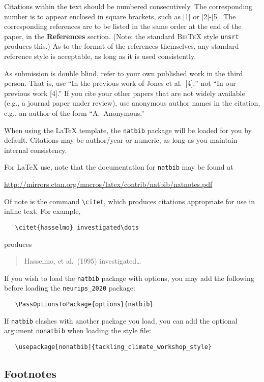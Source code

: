 \documentclass{article}
\begin{document}
Citations within the text should be numbered consecutively.  The corresponding number is to appear enclosed in square brackets, such as [1] or [2]-[5].  The corresponding references are to be listed in the same order at the end of the paper, in the \textbf{References} section. (Note: the standard
\textsc{Bib\TeX} style \texttt{unsrt} produces this.) As to the format of the references themselves, any standard reference style is acceptable, as long as it is used consistently.


As submission is double blind, refer to your own published work in the third
person. That is, use ``In the previous work of Jones et al.\ [4],'' not ``In our
previous work [4].'' If you cite your other papers that are not widely available
(e.g., a journal paper under review), use anonymous author names in the
citation, e.g., an author of the form ``A.\ Anonymous.''

When using the \LaTeX{} template, the \verb+natbib+ package will be loaded for you by default.  Citations may be author/year or numeric, as long as you maintain internal consistency.

For \LaTeX{} use, note that the documentation for \verb+natbib+ may be found at
\begin{center}
  \url{http://mirrors.ctan.org/macros/latex/contrib/natbib/natnotes.pdf}
\end{center}
Of note is the command \verb+\citet+, which produces citations appropriate for
use in inline text.  For example,
\begin{verbatim}
   \citet{hasselmo} investigated\dots
\end{verbatim}
produces
\begin{quote}
  Hasselmo, et al.\ (1995) investigated\dots
\end{quote}

If you wish to load the \verb+natbib+ package with options, you may add the
following before loading the \verb+neurips_2020+ package:
\begin{verbatim}
   \PassOptionsToPackage{options}{natbib}
\end{verbatim}

If \verb+natbib+ clashes with another package you load, you can add the optional
argument \verb+nonatbib+ when loading the style file:
\begin{verbatim}
   \usepackage[nonatbib]{tackling_climate_workshop_style}
\end{verbatim}

\subsection{Footnotes}
\end{document}
